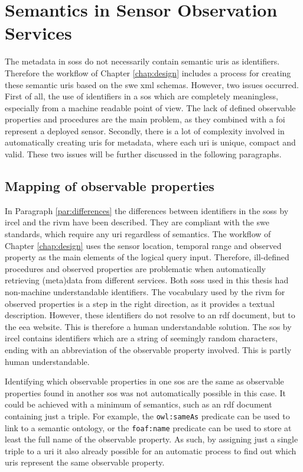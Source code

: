 \section{Semantics in Sensor Observation Services}
The metadata in \aclp{sos} do not necessarily contain semantic \acp{uri} as identifiers. Therefore the workflow of Chapter \ref{chap:design} includes a process for creating these semantic \acp{uri} based on the \ac{swe} \ac{xml} schemas. However, two issues occurred. First of all, the use of identifiers  in a \ac{sos} which are completely meaningless, especially from a machine readable point of view. The lack of defined observable properties and procedures are the main problem, as they combined with a \ac{foi} represent a deployed sensor. Secondly, there is a lot of complexity involved in automatically creating \acp{uri} for metadata, where each \ac{uri} is unique, compact and valid. These two issues will be further discussed in the following paragraphs. 

\subsection{Mapping of observable properties}
In Paragraph \ref{par:differences} the differences between identifiers in the \aclp{sos} by \ac{ircel} and the \ac{rivm} have been described. They are compliant with the \ac{swe} standards, which require any \ac{uri} regardless of semantics. The workflow of Chapter \ref{chap:design} uses the sensor location, temporal range and observed property as the main elements of the logical query input. Therefore, ill-defined procedures and observed properties are problematic when automatically retrieving (meta)data from different services. Both \aclp{sos} used in this thesis had non-machine understandable identifiers. The vocabulary used by the \ac{rivm} for observed properties is a step in the right direction, as it provides a textual description. However, these identifiers do not resolve to an \ac{rdf} document, but to the \ac{eea} website. This is therefore a human understandable solution. The \ac{sos} by \ac{ircel} contains identifiers which are a string of seemingly random characters, ending with an abbreviation of the observable property involved. This is partly human understandable.   

Identifying which observable properties in one \ac{sos} are the same as observable properties found in another \ac{sos} was not automatically possible in this case. It could be achieved with a minimum of semantics, such as an \ac{rdf} document containing just a triple. For example, the \texttt{owl:sameAs} predicate can be used to link to a semantic ontology, or the \texttt{foaf:name} predicate can be used to store at least the full name of the observable property. As such, by assigning just a single triple to a \ac{uri} it also already possible for an automatic process to find out which \acp{uri} represent the same observable property. 

